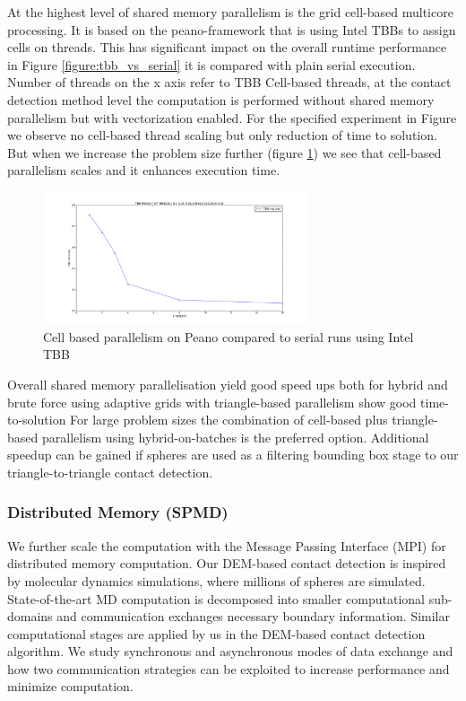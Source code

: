 \documentclass[times,12pt]{article}
\begin{document}
At the highest level of shared memory parallelism is the grid cell-based multicore processing. It is based on the peano-framework that is using Intel TBBs to assign cells on threads. This has significant impact on the overall runtime performance in Figure \ref{figure:tbb_vs_serial} it is compared with plain serial execution. Number of threads on the x axis refer to TBB Cell-based threads, at the contact detection method level the computation is performed without shared memory parallelism but with vectorization enabled. For the specified experiment in Figure {} we observe no cell-based thread scaling but only reduction of time to solution. But when we increase the problem size further (figure \ref{figure:tbb_scaling}) we see that cell-based parallelism scales and it enhances execution time. 

\begin{figure}[htb]
  \begin{center}
    \includegraphics[width=0.7\textwidth]{experiments/random/omp/tbb_regular_x2.png}
  \end{center}
  \caption{Cell based parallelism on Peano compared to serial runs using Intel TBB}
  \label{figure:tbb_scaling}
\end{figure}

Overall shared memory parallelisation yield good speed ups both for hybrid and brute force using adaptive grids with triangle-based parallelism show good time-to-solution For large problem sizes the combination of cell-based plus triangle-based parallelism using hybrid-on-batches is the preferred option. Additional speedup can be gained if spheres are used as a filtering bounding box stage to our triangle-to-triangle contact detection.

\clearpage


\subsubsection{Distributed Memory (SPMD)}

We further scale the computation with the Message Passing Interface (MPI) \cite{Forum:1994:MMI:898758} for distributed memory computation. Our DEM-based contact detection is inspired by molecular dynamics simulations, where millions of spheres are simulated. State-of-the-art MD computation is decomposed into smaller computational sub-domains and communication exchanges necessary boundary information. Similar computational stages are applied by us in the DEM-based contact detection algorithm. We study synchronous and asynchronous modes of data exchange and how two communication strategies can be exploited to increase performance and minimize computation.
\end{document}
